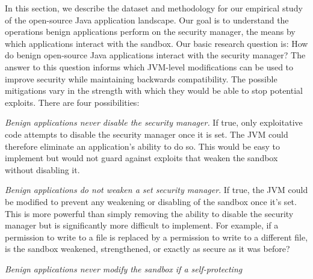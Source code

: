 \documentclass{sig-alternate}
\begin{document}
In this section, we describe the dataset and methodology for our empirical study
of the open-source Java application landscape.  Our goal is to
understand the operations benign applications perform on the
security manager, the 
means by which applications interact with the sandbox.
%
Our basic research question is: How do benign open-source Java applications interact
with the security manager? The answer to this question informs which JVM-level
modifications can be used to improve security
while maintaining backwards compatibility.  The
possible mitigations vary in the strength with which they would be able to stop
potential exploits. 
There are four possibilities:
\begin{flushenum}	\setlength{\parskip}{0pt}
  \setlength{\parsep}{0pt}
  \setlength{\itemsep}{0pt}
\item \textit{Benign applications never disable the security manager.}  If true,
  only exploitative code attempts to disable the security manager once it is set.
  The JVM could therefore eliminate an application's ability to
  do so.  This would be easy to implement but would not guard against exploits
  that weaken the sandbox without disabling it.
\item \textit{Benign applications do not weaken a set security manager}.  If
  true, the JVM could be modified to prevent any weakening or disabling of the 
  sandbox once it's set.  This is more powerful than simply removing the
  ability to disable the security manager but is significantly more difficult to
  implement.
  For example, if a permission to write to a file is
  replaced by a permission to write to a different file, is the sandbox
  weakened, strengthened, or exactly as secure as it was before?
\item \textit{Benign applications never modify the sandbox if a self-protecting
}
\end{flushenum}
\end{document}
